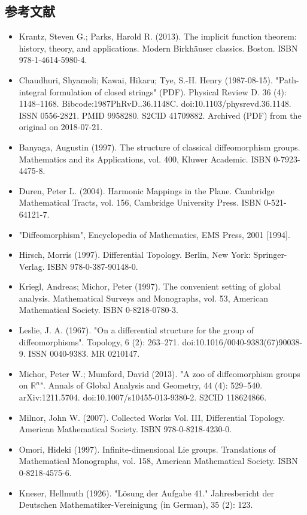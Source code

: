 \subsection{参考文献}
\begin{itemize}
\item Krantz, Steven G.; Parks, Harold R. (2013). The implicit function theorem: history, theory, and applications. Modern Birkhäuser classics. Boston. ISBN 978-1-4614-5980-4.
\item Chaudhuri, Shyamoli; Kawai, Hikaru; Tye, S.-H. Henry (1987-08-15). "Path-integral formulation of closed strings" (PDF). Physical Review D. 36 (4): 1148–1168. Bibcode:1987PhRvD..36.1148C. doi:10.1103/physrevd.36.1148. ISSN 0556-2821. PMID 9958280. S2CID 41709882. Archived (PDF) from the original on 2018-07-21.
\item Banyaga, Augustin (1997). The structure of classical diffeomorphism groups. Mathematics and its Applications, vol. 400, Kluwer Academic. ISBN 0-7923-4475-8.
\item Duren, Peter L. (2004). Harmonic Mappings in the Plane. Cambridge Mathematical Tracts, vol. 156, Cambridge University Press. ISBN 0-521-64121-7.
\item "Diffeomorphism", Encyclopedia of Mathematics, EMS Press, 2001 [1994].
\item Hirsch, Morris (1997). Differential Topology. Berlin, New York: Springer-Verlag. ISBN 978-0-387-90148-0.
\item Kriegl, Andreas; Michor, Peter (1997). The convenient setting of global analysis. Mathematical Surveys and Monographs, vol. 53, American Mathematical Society. ISBN 0-8218-0780-3.
\item Leslie, J. A. (1967). "On a differential structure for the group of diffeomorphisms". Topology, 6 (2): 263–271. doi:10.1016/0040-9383(67)90038-9. ISSN 0040-9383. MR 0210147.
\item Michor, Peter W.; Mumford, David (2013). "A zoo of diffeomorphism groups on $\mathbb{R}^n$". Annals of Global Analysis and Geometry, 44 (4): 529–540. arXiv:1211.5704. doi:10.1007/s10455-013-9380-2. S2CID 118624866.
\item Milnor, John W. (2007). Collected Works Vol. III, Differential Topology. American Mathematical Society. ISBN 978-0-8218-4230-0.
\item Omori, Hideki (1997). Infinite-dimensional Lie groups. Translations of Mathematical Monographs, vol. 158, American Mathematical Society. ISBN 0-8218-4575-6.
\item Kneser, Hellmuth (1926). "Lösung der Aufgabe 41." Jahresbericht der Deutschen Mathematiker-Vereinigung (in German), 35 (2): 123.
\end{itemize}
